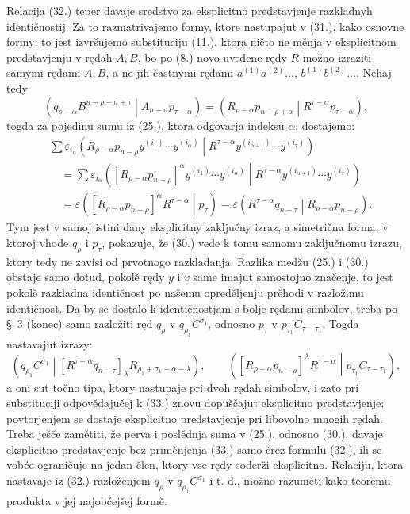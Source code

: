 \documentclass[11pt]{article}
\newcommand{\pair}[2]{\left(#1\middle|#2\right)}
\newcommand{\eps}{\varepsilon}
\begin{document}
Relacija (32.) teper davaje sredstvo za eksplicitno predstavjenje razkladnyh identičnostij. Za to razmatrivajemo formy, ktore nastupajut v (31.), kako osnovne formy; to jest izvršujemo substituciju (11.), ktora ničto ne měnja v eksplicitnom predstavjenju v rędah $A,B$, bo po (8.) novo uvedene rędy $R$ možno izraziti samymi rędami $A,B$, a ne jih častnymi rędami $a^{(1)}a^{(2)}\ldots$, $b^{(1)}b^{(2)}\ldots$. Nehaj tedy
\begin{equation}
 \pair{q_{\rho-\alpha}B^{n-\rho-\sigma+\tau}}{A_{n-\sigma}p_{\tau-\alpha}}
 =\pair{R_{\rho-\alpha}p_{n-\rho+\alpha}}{R^{\tau-\alpha}p_{\tau-\alpha}},
\tag{33}
\end{equation}
togda za pojedinu sumu iz (25.), ktora odgovarja indeksu $\alpha$, dostajemo:
\begin{equation}
\begin{aligned}
&\sum \eps_{i_\alpha}
\pair{R_{\rho-\alpha}p_{n-\rho}y^{(i_1)}\cdots y^{(i_\alpha)}}
{R^{\tau-\alpha}y^{(i_{\alpha+1})}\cdots y^{(i_\tau)}}\\
&\quad=\sum \eps_{i_\alpha}
\pair{[R_{\rho-\alpha}p_{n-\rho}]^\alpha
y^{(i_1)}\cdots y^{(i_\alpha)}}
{R^{\tau-\alpha}y^{(i_{\alpha+1})}\cdots y^{(i_\tau)}}\\
&\quad=\eps\pair{[R_{\rho-\alpha}p_{n-\rho}]^\alpha R^{\tau-\alpha}}{p_\tau}
 =\eps\pair{R^{\tau-\alpha}q_{n-\tau}}{R_{\rho-\alpha}p_{n-\rho}}.
\end{aligned}
\tag{34}
\end{equation}
Tym jest v samoj istini dany eksplicitny zaključny izraz, a simetrična forma, v ktoroj vhode $q_\rho$ i $p_\tau$, pokazuje, že (30.) vede k tomu samomu zaključnomu izrazu, ktory tedy ne zavisi od prvotnogo razkladanja. Razlika medžu (25.) i (30.) obstaje samo dotud, pokolě rędy $y$ i $v$ same imajut samostojno značenje, to jest pokolě razkladna identičnost po našemu opreděljenju prěhodi v razložimu identičnost. Da by se dostalo k identičnostjam s bolje rędami simbolov, treba po \S\ 3 (konec) samo razložiti ręd $q_\rho$ v $q_{\rho_1}C^{\sigma_1}$, odnosno $p_\tau$ v $p_{\tau_1}C_{\tau-\tau_1}$. Togda nastavajut izrazy:
\begin{equation}
 \pair{q_{\rho_1}C^{\sigma_1}}
 {[R^{\tau-\alpha}q_{n-\tau}]_\lambda R_{\rho_1+\sigma_1-\alpha-\lambda}},
 \qquad
 \pair{[R_{\rho-\alpha}p_{n-\rho}]^\lambda R^{\tau-\alpha}}
 {p_{\tau_1}C_{\tau-\tau_1}},
\tag{35}
\end{equation}
a oni sut točno tipa, ktory nastupaje pri dvoh rędah simbolov, i zato pri substituciji odpovědajučej k (33.) znovu dopuščajut eksplicitno predstavjenje; povtorjenjem se dostaje eksplicitno predstavjenje pri libovolno mnogih rędah. Treba ješče zamětiti, že perva i poslědnja suma v (25.), odnosno (30.), davaje eksplicitno predstavjenje bez priměnjenja (33.) samo črez formulu (32.), ili se vobće ograničuje na jedan člen, ktory vse rędy soderži eksplicitno. Relaciju, ktora nastavaje iz (32.) razloženjem $q_\rho$ v $q_{\rho_1}C^{\sigma_1}$ i t. d., možno razuměti kako teoremu produkta v jej najobćejšej formě.
\end{document}
